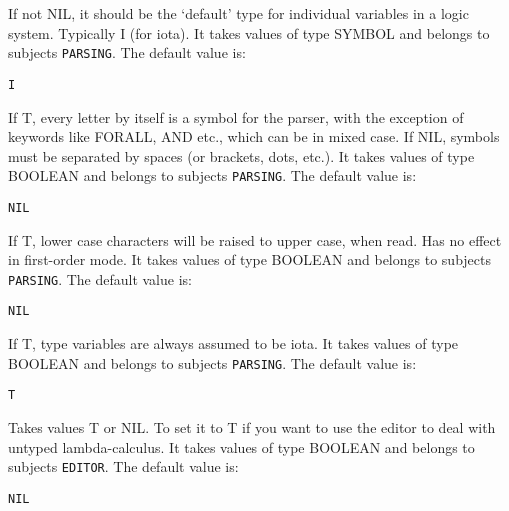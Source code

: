 \begin{description} 
\item[BASE-TYPE]  
If not NIL, it should be the `default' type for individual
variables in a logic system.  Typically I (for iota).
It takes values of type SYMBOL and belongs to subjects \texttt{PARSING}.  The default value is: \begin{lstlisting}
I
\end{lstlisting}

\item[FIRST-ORDER-MODE-PARSE]  
If T, every letter by itself is a symbol for the parser,
with the exception of keywords like FORALL, AND etc.,
which can be in mixed case.  If NIL, symbols must be separated by
spaces (or brackets, dots, etc.).
It takes values of type BOOLEAN and belongs to subjects \texttt{PARSING}.  The default value is: \begin{lstlisting}
NIL
\end{lstlisting}

\item[LOWERCASERAISE]  
If T, lower case characters will be raised to upper case, when read.
Has no effect in first-order mode.
It takes values of type BOOLEAN and belongs to subjects \texttt{PARSING}.  The default value is: \begin{lstlisting}
NIL
\end{lstlisting}

\item[TYPE-IOTA-MODE]  
If T, type variables are always assumed to be iota.
It takes values of type BOOLEAN and belongs to subjects \texttt{PARSING}.  The default value is: \begin{lstlisting}
T
\end{lstlisting}

\item[UNTYPED-LAMBDA-CALCULUS]  
Takes values T or NIL. To set it to T if you want to use the editor to deal with 
untyped lambda-calculus.
It takes values of type BOOLEAN and belongs to subjects \texttt{EDITOR}.  The default value is: \begin{lstlisting}
NIL
\end{lstlisting}

\item
\end{description}

